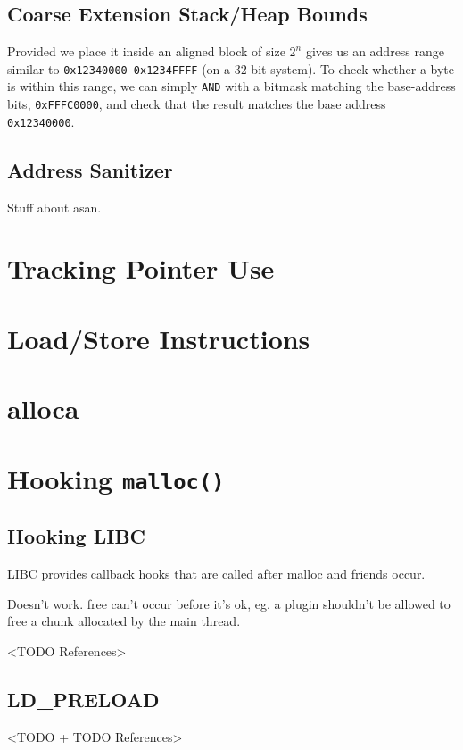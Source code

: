 \subsection {Coarse Extension Stack/Heap Bounds}

Provided we place it inside an aligned block of size $2^n$ gives us an address
range similar to \texttt{0x12340000-0x1234FFFF} (on a 32-bit system). To check
whether a byte is within this range, we can simply \texttt{AND} with a bitmask
matching the base-address bits, \texttt{0xFFFC0000}, and check that the result
matches the base address \texttt{0x12340000}.

\subsection {Address Sanitizer}

Stuff about asan.

\section {Tracking Pointer Use}

\section {Load/Store Instructions}

\section {alloca}

\section {Hooking \texttt{malloc()}}

\subsection {Hooking LIBC}

LIBC provides callback hooks that are called after malloc and friends occur.

Doesn't work. free can't occur before it's ok, eg. a plugin shouldn't be
allowed to free a chunk allocated by the main thread.

<TODO References>

\subsection {LD\_PRELOAD}

<TODO + TODO References>
